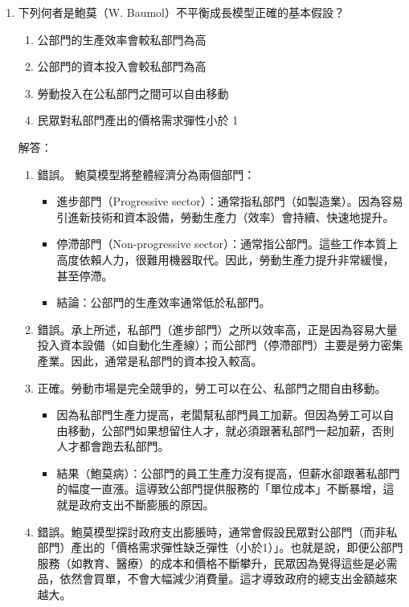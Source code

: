 \documentclass[12pt, a4paper]{article}
\begin{document}
\begin{enumerate}
    \item 下列何者是鮑莫（W. Baumol）不平衡成長模型正確的基本假設？
    \begin{enumerate}[label=\Alph*.]
        \item 公部門的生產效率會較私部門為高
        \item 公部門的資本投入會較私部門為高
        \item 勞動投入在公私部門之間可以自由移動
        \item 民眾對私部門產出的價格需求彈性小於 1
    \end{enumerate}
    解答：
    \begin{enumerate}[label=\Alph*.]
        \item 錯誤。 鮑莫模型將整體經濟分為兩個部門：
        \begin{itemize}
            \item 進步部門（Progressive sector）：通常指私部門（如製造業）。因為容易引進新技術和資本設備，勞動生產力（效率）會持續、快速地提升。
            \item 停滯部門（Non-progressive sector）：通常指公部門。這些工作本質上高度依賴人力，很難用機器取代。因此，勞動生產力提升非常緩慢，甚至停滯。
            \item 結論：公部門的生產效率通常低於私部門。
        \end{itemize}
        \item 錯誤。承上所述，私部門（進步部門）之所以效率高，正是因為容易大量投入資本設備（如自動化生產線）；而公部門（停滯部門）主要是勞力密集產業。因此，通常是私部門的資本投入較高。
        \item 正確。勞動市場是完全競爭的，勞工可以在公、私部門之間自由移動。
        \begin{itemize}
            \item 因為私部門生產力提高，老闆幫私部門員工加薪。但因為勞工可以自由移動，公部門如果想留住人才，就必須跟著私部門一起加薪，否則人才都會跑去私部門。
            \item 結果（鮑莫病）：公部門的員工生產力沒有提高，但薪水卻跟著私部門的幅度一直漲。這導致公部門提供服務的「單位成本」不斷暴增，這就是政府支出不斷膨脹的原因。
        \end{itemize}
        \item 錯誤。鮑莫模型探討政府支出膨脹時，通常會假設民眾對公部門（而非私部門）產出的「價格需求彈性缺乏彈性（小於1）」。也就是說，即便公部門服務（如教育、醫療）的成本和價格不斷攀升，民眾因為覺得這些是必需品，依然會買單，不會大幅減少消費量。這才導致政府的總支出金額越來越大。
    \end{enumerate}


\end{enumerate}
\end{document}
